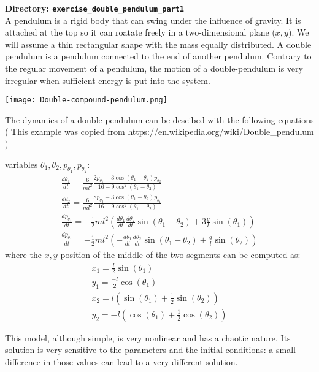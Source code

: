 {\bf Directory: {\tt exercise\_double\_pendulum\_part1}}\\

A pendulum is a rigid body that can swing under the influence of gravity. It is attached at the top so it can roatate freely in a two-dimensional plane ($x,y$).
We will assume a thin rectangular shape with the mass equally distributed. A double pendulum is a pendulum connected to the end of another pendulum. Contrary to the 
regular movement of a pendulum, the motion of a double-pendulum is very irregular when sufficient energy is put into the system. 

\texttt{[image: Double-compound-pendulum.png]}

The dynamics of a double-pendulum can be descibed with the following equations 
( This example was copied from https://en.wikipedia.org/wiki/Double\_pendulum )

variables $\theta_1, \theta_2, p_{\theta_1}, p_{\theta_2}$:
\begin{eqnarray}
   \frac{d \theta_1}{dt}= \frac{6}{m l^2} \frac{2 p_{\theta_1} - 3\cos(\theta_1-\theta_2) p_{\theta_2}}
   {16-9 \cos^2(\theta_1-\theta_2)}\\
   \frac{d \theta_2}{dt}= \frac{6}{m l^2} \frac{8 p_{\theta_2} - 3\cos(\theta_1-\theta_2) p_{\theta_1}}
   {16-9 \cos^2(\theta_1-\theta_2)}\\
   \frac{dp_{\theta_1}}{dt} = -\frac{1}{2} ml^2 \left( \frac{d \theta_1}{dt} \frac{d \theta_2}{dt} \sin(\theta_1-\theta_2) + 3\frac{g}{l} \sin(\theta_1) \right)  \\
   \frac{dp_{\theta_1}}{dt} = -\frac{1}{2} ml^2 \left( -\frac{d \theta_1}{dt} \frac{d \theta_2}{dt} \sin(\theta_1-\theta_2) + \frac{g}{l} \sin(\theta_2) \right) 
\end{eqnarray}
where the $x,y$-position of the middle of the two segments can be computed as:
\begin{eqnarray}
   x_1 = \frac{l}{2} \sin(\theta_1) \\
   y_1 = \frac{-l}{2} \cos(\theta_1) \\
   x_2 = l ( \sin(\theta_1) + \frac{1}{2} \sin(\theta_2) ) \\
   y_2 = -l ( \cos(\theta_1) + \frac{1}{2} \cos(\theta_2) )
\end{eqnarray}

This model, although simple, is very nonlinear and has a chaotic nature.  Its
solution is very sensitive to the parameters and the initial conditions: a
small difference in those values can lead to a very different solution.

